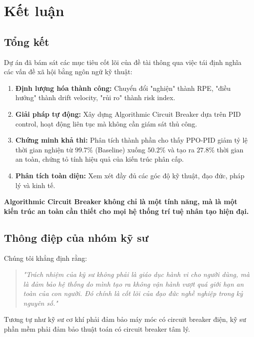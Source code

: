 \section{Kết luận}

\subsection{Tổng kết}

Dự án đã bám sát các mục tiêu cốt lõi của đề tài thông qua việc tái định nghĩa các vấn đề xã hội bằng ngôn ngữ kỹ thuật:

\begin{enumerate}
    \item \textbf{Định lượng hóa thành công:} Chuyển đổi "nghiện" thành RPE, "điều hướng" thành drift velocity, "rủi ro" thành risk index.
    
    \item \textbf{Giải pháp tự động:} Xây dựng Algorithmic Circuit Breaker dựa trên PID control, hoạt động liên tục mà không cần giám sát thủ công.
    
    \item \textbf{Chứng minh khả thi:} Phân tích thành phần cho thấy PPO-PID giảm tỷ lệ thời gian nghiện từ $99.7\%$ (Baseline) xuống $50.2\%$ và tạo ra $27.8\%$ thời gian an toàn, chứng tỏ tính hiệu quả của kiến trúc phân cấp.
    
    \item \textbf{Phân tích toàn diện:} Xem xét đầy đủ các góc độ kỹ thuật, đạo đức, pháp lý và kinh tế.
\end{enumerate}

\textbf{Algorithmic Circuit Breaker không chỉ là một tính năng, mà là một kiến trúc an toàn cần thiết cho mọi hệ thống trí tuệ nhân tạo hiện đại.}

\subsection{Thông điệp của nhóm kỹ sư}

Chúng tôi khẳng định rằng:

\begin{quote}
\textit{"Trách nhiệm của kỹ sư không phải là giáo dục hành vi cho người dùng, mà là đảm bảo hệ thống do mình tạo ra không vận hành vượt quá giới hạn an toàn của con người. Đó chính là cốt lõi của đạo đức nghề nghiệp trong kỷ nguyên số."}
\end{quote}

Tương tự như kỹ sư cơ khí phải đảm bảo máy móc có circuit breaker điện, kỹ sư phần mềm phải đảm bảo thuật toán có circuit breaker tâm lý.

